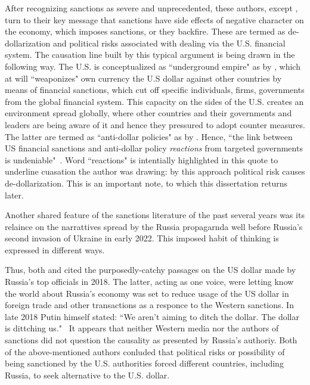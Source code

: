 After recognizing sanctions as severe and unprecedented, these authors, except \cite{baker2024}, turn to their key message that sanctions have side effects of negative character on the economy, which imposes sanctions, or they backfire. These are termed as de-dollarization and political risks associated with dealing via the U.S. financial system. The causation line built by this typical argument is being drawn in the following way. The U.S. is conceptualized as ``underground empire" as by \cite{farrell2023}, which at will ``weaponizes" own currency the U.S dollar against other countries by means of financial sanctions, which cut off specific individuals, firms, governments from the global financial system. This capacity on the sides of the U.S. creates an environment spread globally, where other countries and their governments and leaders are being aware of it and hence they pressured to adopt counter measures. The latter are termed as ``anti-dollar policies" as by \cite{mcdowell}. Hence, ``the link between US financial sanctions and anti-dollar policy \textit{reactions} from targeted governments is undeniable"~\citep[p.~5, emphasis added]{mcdowell}. Word ``reactions" is intentially highlighted in this quote to underline cuasation the author was drawing: by this approach political risk causes de-dollarization. This is an important note, to which this dissertation returns later.

Another shared feature of the sanctions literature of the past several years was its relaince on the narrattives spread by the Russia propagarnda well before Russia's second invasion of Ukraine in early 2022. This imposed habit of thinking is expressed in different ways.

Thus, both \cite{mcdowell} and \cite{demarais2022} cited the purposedly-catchy passages on the US dollar made by Russia's top officials in 2018. The latter, acting as one voice, were letting know the world about Russia's economy was set to reduce usage of the US dollar in foreign trade and other transactions as a responce to the Western sanctions. In late 2018 Putin himself stated: ``We aren't aiming to ditch the dollar. The dollar is dittching us."~\citep[p.~126]{demarais2022} It appears that neither Western media nor the authors of sanctions did not question the causality as presented by Russia's authoriy. Both of the above-mentioned authors conluded that political risks or possibility of being sanctioned by the U.S. authorities forced different countries, including Russia, to seek alternative to the U.S. dollar.

